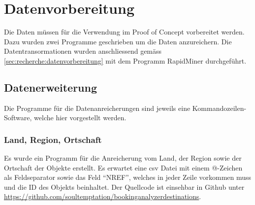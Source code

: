

\section{Datenvorbereitung}
\label{sec:proofofconcept:datenvorbereitung}


Die Daten müssen für die Verwendung im Proof of Concept vorbereitet werden. Dazu wurden zwei Programme geschrieben um die Daten anzureichern. Die Datentransormationen wurden anschliessend gemäss \cref{sec:recherche:datenvorbereitung} mit dem Programm RapidMiner durchgeführt.

\subsection{Datenerweiterung}
\label{sec:proofofconcept:datenvorbereitung:datenerweiterung}
Die Programme für die Datenanreicherungen sind jeweils eine Kommandozeilen-Software, welche hier vorgestellt werden.

\subsubsection{Land, Region, Ortschaft}
\label{sec:proofofconcept:datenvorbereitung:datenerweiterung:landregionortschaft}
Es wurde ein Programm für die Anreicherung vom Land, der Region sowie der Ortschaft der Objekte erstellt. Es erwartet eine \gls{csv} Datei mit einem @-Zeichen als Feldseparator sowie das Feld "`NREF"', welches in jeder Zeile vorkommen muss und die ID des Objekts beinhaltet. Der Quellcode ist einsehbar in Github unter \url{https://github.com/soultemptation/bookinganalyzerdestinations}.

